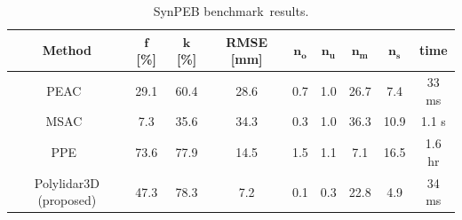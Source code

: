 \begin{table}[H]
\centering
\caption{SynPEB benchmark~results.  }
\label{table:ch3_synpeb_results}
\begin{tabular}{@{}ccccccccc@{}}
\toprule
\textbf{Method}                                  & $\textbf{f}$ {\textbf{[}}\textbf{\%}{\textbf{]}} & $\textbf{k}$ {\textbf{[}}\textbf{\%}{\textbf{]}} & \textbf{RMSE} {\textbf{[}}\textbf{mm}{\textbf{]}} & $\textbf{n}_\textbf{o}$ & $\textbf{n}_\textbf{u}$ & $\textbf{n}_\textbf{m}$ & $\textbf{n}_\textbf{s}$ & \textbf{time}\\ \midrule
PEAC~\cite{feng_fast_2014}              & 29.1         & 60.4         & 28.6          & 0.7   & 1.0   & 26.7  & 7.4   & 33 ms\\
MSAC~\cite{torr_mlesac_2000}            & 7.3          & 35.6         & 34.3          & 0.3   & 1.0   & 36.3  & 10.9  & 1.1 s\\
PPE~\cite{schaefer_maximum_2019}      & 73.6         & 77.9         & 14.5          & 1.5   & 1.1   & 7.1   & 16.5  & 1.6 hr\\
Polylidar3D (proposed)                  & 47.3         & 78.3         & 7.2           & 0.1   & 0.3   & 22.8  & 4.9  & 34 ms\\ \bottomrule
\end{tabular}
\end{table}






